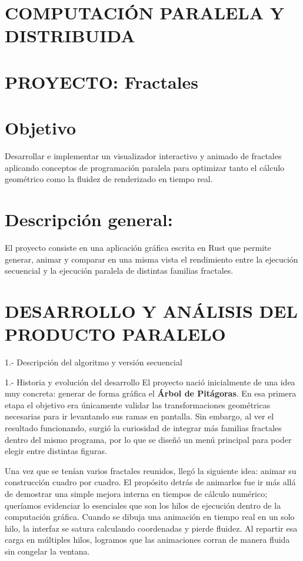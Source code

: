   



{\centering \section*{COMPUTACIÓN PARALELA Y DISTRIBUIDA}\par}
{\centering \section*{PROYECTO: Fractales}\par}
\section*{Objetivo}
Desarrollar e implementar un visualizador interactivo y animado de fractales aplicando conceptos de programación paralela para optimizar tanto el cálculo geométrico como la fluidez de renderizado en tiempo real.
\section*{Descripción general:} El proyecto consiste en una aplicación gráfica escrita en Rust que permite generar, animar y comparar en una misma vista el rendimiento entre la ejecución secuencial y la ejecución paralela de distintas familias fractales.


{\centering \section*{DESARROLLO Y ANÁLISIS DEL PRODUCTO PARALELO}\par}

\begin{ejercicio}{1.- Descripción del algoritmo y versión secuencial}
\end{ejercicio}

\begin{respuesta}{1.- Historia y evolución del desarrollo}
    El proyecto nació inicialmente de una idea muy concreta: generar de forma gráfica el \textbf{Árbol de Pitágoras}. En esa primera etapa el objetivo era únicamente validar las transformaciones geométricas necesarias para ir levantando sus ramas en pantalla. Sin embargo, al ver el resultado funcionando, surgió la curiosidad de integrar más familias fractales dentro del mismo programa, por lo que se diseñó un menú principal para poder elegir entre distintas figuras.

    Una vez que se tenían varios fractales reunidos, llegó la siguiente idea: animar su construcción cuadro por cuadro. El propósito detrás de animarlos fue ir más allá de demostrar una simple mejora interna en tiempos de cálculo numérico; queríamos evidenciar lo esenciales que son los hilos de ejecución dentro de la computación gráfica. Cuando se dibuja una animación en tiempo real en un solo hilo, la interfaz se satura calculando coordenadas y pierde fluidez. Al repartir esa carga en múltiples hilos, logramos que las animaciones corran de manera fluida sin congelar la ventana.
\end{respuesta}

